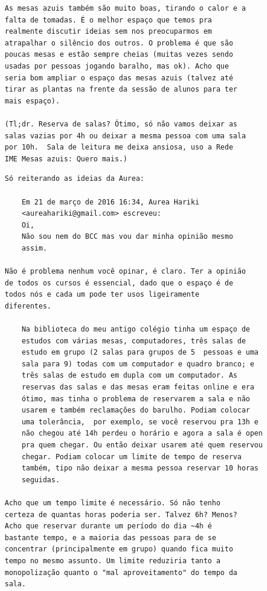 \documentclass[titlepage]{article}
\begin{document}
\begin{lstlisting}[caption=Enviado por Aurea Hariki]
As mesas azuis também são muito boas, tirando o calor e a 
falta de tomadas. É o melhor espaço que temos pra 
realmente discutir ideias sem nos preocuparmos em 
atrapalhar o silêncio dos outros. O problema é que são 
poucas mesas e estão sempre cheias (muitas vezes sendo 
usadas por pessoas jogando baralho, mas ok). Acho que 
seria bom ampliar o espaço das mesas azuis (talvez até 
tirar as plantas na frente da sessão de alunos para ter 
mais espaço).

(Tl;dr. Reserva de salas? Ótimo, só não vamos deixar as 
salas vazias por 4h ou deixar a mesma pessoa com uma sala 
por 10h.  Sala de leitura me deixa ansiosa, uso a Rede 
IME Mesas azuis: Quero mais.)
\end{lstlisting}


\begin{lstlisting}[caption=Enviado por Renato Cordeiro]
Só reiterando as ideias da Aurea:

    Em 21 de março de 2016 16:34, Aurea Hariki 
    <aureahariki@gmail.com> escreveu:
    Oi,
    Não sou nem do BCC mas vou dar minha opinião mesmo 
    assim.

Não é problema nenhum você opinar, é claro. Ter a opinião 
de todos os cursos é essencial, dado que o espaço é de 
todos nós e cada um pode ter usos ligeiramente 
diferentes.

    Na biblioteca do meu antigo colégio tinha um espaço de 
    estudos com várias mesas, computadores, três salas de 
    estudo em grupo (2 salas para grupos de 5  pessoas e uma 
    sala para 9) todas com um computador e quadro branco; e 
    três salas de estudo em dupla com um computador. As 
    reservas das salas e das mesas eram feitas online e era 
    ótimo, mas tinha o problema de reservarem a sala e não 
    usarem e também reclamações do barulho. Podiam colocar 
    uma tolerância,  por exemplo, se você reservou pra 13h e 
    não chegou até 14h perdeu o horário e agora a sala é open 
    pra quem chegar. Ou então deixar usarem até quem reservou 
    chegar. Podiam colocar um limite de tempo de reserva 
    também, tipo não deixar a mesma pessoa reservar 10 horas 
    seguidas.

Acho que um tempo limite é necessário. Só não tenho 
certeza de quantas horas poderia ser. Talvez 6h? Menos? 
Acho que reservar durante um período do dia ~4h é 
bastante tempo, e a maioria das pessoas para de se 
concentrar (principalmente em grupo) quando fica muito 
tempo no mesmo assunto. Um limite reduziria tanto a 
monopolização quanto o "mal aproveitamento" do tempo da 
sala. 


\end{lstlisting}
\end{document}
